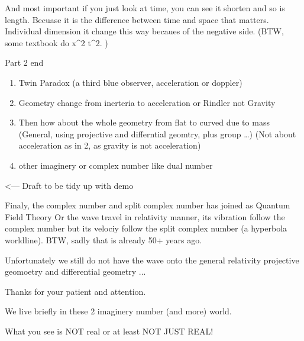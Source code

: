 \documentclass[letterpaper,10pt,english]{jupyterBook}
\begin{document}
\sphinxAtStartPar
And most important if you just look at time, you can see it shorten and so is length.  Becuase it is the difference between time and space that matters.  Individual dimension it change this way becaues of the negative side.  (BTW, some textbook do  x\textasciicircum{}2 \sphinxhyphen{} t\textasciicircum{}2.  )

\sphinxAtStartPar
Part 2 end
\begin{enumerate}
%
\item {} 
\sphinxAtStartPar
Twin Paradox (a third blue observer, acceleration or doppler)

\item {} 
\sphinxAtStartPar
Geometry change from inerteria to acceleration or Rindler not Gravity

\item {} 
\sphinxAtStartPar
Then how about the whole geometry from flat to curved due to mass
(General, using projective and differntial geomtry, plus group …)
(Not about acceleration as in 2, as gravity is not acceleration)

\item {} 
\sphinxAtStartPar
other imaginery or complex  number like dual number

\end{enumerate}

\sphinxAtStartPar
<— Draft to be tidy up with demo

\begin{sphinxVerbatim}[commandchars=\\\{\}]
Finaly, the complex number and split complex number has joined as Quantum Field Theory
Or the wave travel in relativity manner, 
\PYGZhy{}\PYGZhy{} its vibration follow the complex number 
\PYGZhy{}\PYGZhy{} but its velociy follow the split complex number (a hyperbola worldline).  
BTW, sadly that is already 50+ years ago.

Unfortunately we still do not have the wave onto the general relativity
    \PYGZhy{}\PYGZhy{} projective geomoetry and differential geometry ...

Thanks for your patient and attention.

We live briefly in these 2 imaginery number (and more) world.  

What you see is NOT real or at least NOT JUST REAL!
\end{sphinxVerbatim}

\sphinxstepscope
\end{document}
